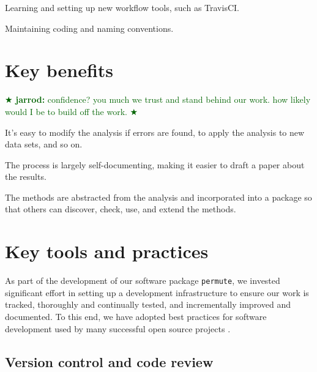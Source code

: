 \documentclass[]{article}
\newcommand{\jarrod}[1] { \textcolor{darkgreen} {
\ensuremath{\bigstar} {\bf jarrod:}  {#1}
\ensuremath{\bigstar} } }
\begin{document}
Learning and setting up new workflow tools, such as TravisCI.

Maintaining coding and naming conventions.

\section{Key benefits}\label{key-benefits}


\jarrod{confidence?  you much we trust and stand behind our work.
how likely would I be to build off the work.}

It's easy to modify the analysis if errors are found, to apply the
analysis to new data sets, and so on.

The process is largely self-documenting, making it easier to draft a
paper about the results.

The methods are abstracted from the analysis and incorporated into a
package so that others can discover, check, use, and extend the
methods.

\section{Key tools and practices}\label{key-tools}


As part of the development of our software package \texttt{permute}, we
invested significant effort in setting up a development infrastructure to
ensure our work is tracked, thoroughly and continually tested, and
incrementally improved and documented.
To this end, we have adopted best practices for software development used by
many successful open source projects \cite{millman2014developing}.

\subsection{\label{sec:vc}Version control and code review}
\end{document}
